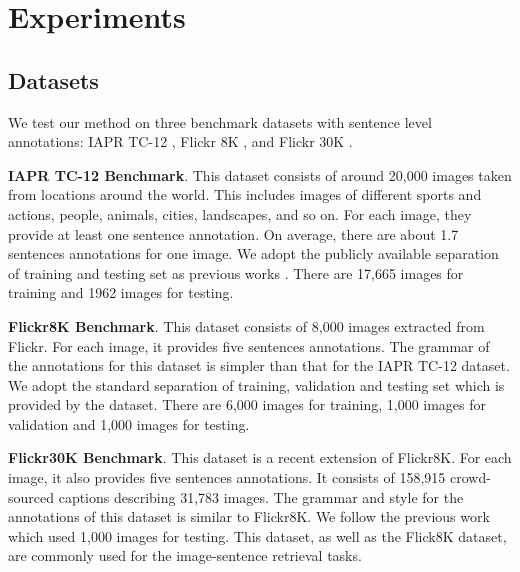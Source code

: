 
\section{Experiments}

\subsection{Datasets}
We test our method on three benchmark datasets with sentence level annotations: IAPR TC-12 \cite{grubinger2006iapr}, Flickr 8K \cite{rashtchian2010collecting}, and Flickr 30K \cite{hodoshimage}.


\textbf{IAPR TC-12 Benchmark}.
This dataset consists of around 20,000 images taken from locations around the world.
This includes images of different sports and actions, people, animals, cities, landscapes, and so on.
For each image, they provide at least one sentence annotation.
On average, there are about 1.7 sentences annotations for one image.
We adopt the publicly available separation of training and testing set as previous works \cite{GVS10a,kiros2013multimodal}.
There are 17,665 images for training and 1962 images for testing.

\textbf{Flickr8K Benchmark}.
This dataset consists of 8,000 images extracted from Flickr.
For each image, it provides five sentences annotations.
The grammar of the annotations for this dataset is simpler than that for the IAPR TC-12 dataset.
We adopt the standard separation of training, validation and testing set which is provided by the dataset.
There are 6,000 images for training, 1,000 images for validation and 1,000 images for testing.

\textbf{Flickr30K Benchmark}.
This dataset is a recent extension of Flickr8K.
For each image, it also provides five sentences annotations.
It consists of 158,915 crowd-sourced captions describing 31,783 images.
The grammar and style for the annotations of this dataset is similar to Flickr8K.
We follow the previous work \cite{karpathy2014fragment} which used 1,000 images for testing.
This dataset, as well as the Flick8K dataset, are commonly used for the image-sentence retrieval tasks.

